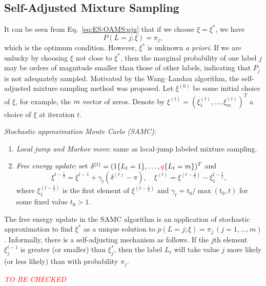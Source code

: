 \subsection{Self-Adjusted Mixture Sampling}
It can be seen from Eq.~\ref{eq:ES:OAMS:pjx} that if we choose $\xi=\xi^\ast$, we have
\begin{equation}
    P(L=j;\xi)=\pi_j,
\end{equation}
which is the optimum condition. However, $\xi^\ast$ is unknown \textit{a priori}. If we are unlucky by choosing $\xi$ not close to $\xi^\ast$, then the marginal probability of one label $j$ may be orders of magnitude smaller than those of other labels, indicating that $P_j$ is not adequately sampled. Motivated by the Wang--Landau algorithm, the self-adjusted mixture sampling method was proposed. Let $\xi^{(0)}$ be some initial choice of $\xi$, for example, the $m\time 1$ vector of zeros. Denote by $\xi^{(t)}=(\xi_1^{(t)},\dots,\xi_m^{(t)})^T$ a choice of $\xi$ at iteration $t$.

\textit{Stochastic approximation Monte Carlo (SAMC)}:
\begin{enumerate}
	\item \textit{Local jump and Markov move}: same as local-jump labeled mixture sampling.
	\item \textit{Free energy update}: set $\delta^{(t)}=(1\{L_t=1\},\dots,\textcolor{red}{q}\{L_t=m\})^T$ and
	\begin{equation*}
	    \xi^{t-\frac12}=\xi^{t-1}+\gamma_t(\delta^{(t)}-\pi),\quad \xi^{(t)}=\xi^{(t-\frac12)}-\xi_1^{t-\frac12},
	\end{equation*}
	where $\xi_1^{(t-\frac12)}$ is the first element of $\xi^{(t-\frac12)}$ and $\gamma_t=t_0/\max(t_0,t)$ for some fixed value $t_0>1$.
\end{enumerate}

The free energy update in the SAMC algorithm is an application of stochastic approximation to find $\xi^\ast$ as a unique solution to $p(L=j;\xi)=\pi_j\,(j=1,\dots,m)$. Informally, there is a self-adjusting mechanism as follows. If the $j$th element $\xi_j^{t-1}$ is greater (or smaller) than $\xi_j^\ast$, then the label $L_t$ will take value $j$ more likely (or less likely) than with probability $\pi_j$.

\emph{\textcolor{red}{TO BE CHECKED}}